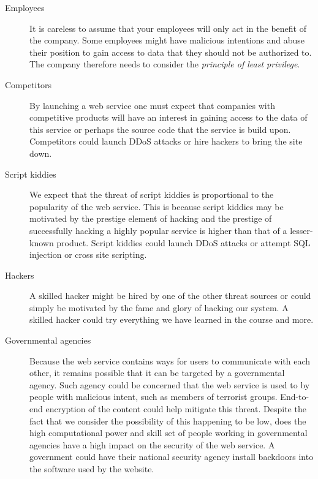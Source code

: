 \documentclass{article}
\begin{document}
\begin{description}

\item[Employees]
It is careless to assume that your employees will only act in the benefit of the company. 
Some employees might have malicious intentions and abuse their position to gain access to data that they should not be authorized to. 
The company therefore needs to consider the \emph{principle of least privilege}. 

\item[Competitors]
By launching a web service one must expect that companies with competitive products will have an interest 
in gaining access to the data of this service or perhaps the source code that the service is build upon. 
Competitors could launch DDoS attacks or hire hackers to bring the site down.

\item[Script kiddies]
We expect that the threat of script kiddies is proportional to the popularity of the web service. 
This is because script kiddies may be motivated by the prestige element of hacking and the prestige of 
successfully hacking a highly popular service is higher than that of a lesser-known product.
Script kiddies could launch DDoS attacks or attempt SQL injection or cross site scripting.

\item[Hackers]
A skilled hacker might be hired by one of the other threat sources or 
could simply be motivated by the fame and glory of hacking our system.
A skilled hacker could try everything we have learned in the course and more.

\item[Governmental agencies]
Because the web service contains ways for users to communicate with each other, 
it remains possible that it can be targeted by a governmental agency. 
Such agency could be concerned that the web service is used to by people with malicious intent, 
such as members of terrorist groups. 
End-to-end encryption of the content could help mitigate this threat. 
Despite the fact that we consider the possibility of this happening to be low, 
does the high computational power and skill set of people working in governmental agencies have a high impact on the security of the web service. 
A government could have their national security agency install backdoors into the software used by the website.

\end{description}
\end{document}
